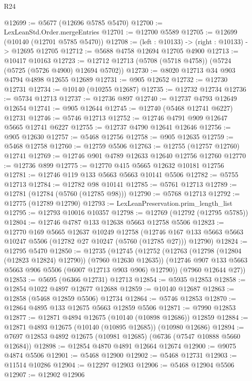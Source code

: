 \begin{lexlean}{R24}
\begin{coremodule}
@12699 := @5677 (@12696 @5785 @5470)
@12700 := LexLeanStd.Order.mergeEntries
@12701 := @12700 @5589
@12705 := @12699 (@10140 (@12701 @5785 @5470))
@12708 := (left : @10133) -> (right : @10133) -> @12695 @12705
@12712 := @5688 @4758 @12694 @12705 @4900
@12713 := @10417 @10163
@12723 := @12712 @12713 (@5708 (@5718 @4758)) (@5724 (@5725 (@5726 @4900) @12694 @5702))
@12730 := @8020 @12713 @34 @903 @4794 @4898 @12655 @12689
@12731 := @905 @12652
@12732 := @12730 @12731
@12734 := @10140 (@10255 @12687)
@12735 := @12732 @12734
@12736 := @5734 @12713
@12737 := @12736 @897
@12740 := @12737 @4793 @12649 @12654
@12741 := @905 @12644
@12745 := @12740 (@5468 @12741 @6227) @12731
@12746 := @5746 @12713
@12752 := @12746 @4791 @909 @12647 @5665 @12741 @6227
@12755 := @12737 @4790 @12641 @12646
@12756 := @905 @12630
@12757 := @5468 @12756
@12758 := @905 @12635
@12759 := @5468 @12758
@12760 := @12759 @5506
@12763 := @12755 (@12757 @12760) @12741
@12769 := @12746 @901 @4789 @12633 @12640 @12756 @12760
@12770 := @12736 @899
@12775 := @12770 @415 @5665 @12632 @10181 @12756
@12781 := @12746 @119 @133 @5663 @5663 @10141 @5506
@12782 := @5755 @12713
@12784 := @12782 @98 @10141
@12785 := @5761 @12713
@12789 := @12781 (@12784 (@5760 (@12785 @98)))
@12790 := @5768 @12713
@12792 := @12775 (@12789 @12790)
@12793 := LexLeanPreservation.prim_length_list
@12795 := @12793 @10016 @10357
@12798 := @12769 (@12792 (@12795 @5785))
@12804 := @12746 @4787 @133 @12638 @5663 @12758 @5506
@12823 := @12770
    @169
    @5665
    @12637
    @10249
    @12758
    (@12746 @167 @133 @5663 @5663 @10247 @5506 (@12782 @27 @10247 (@5760 (@12785 @27))) @12790)
@12824 := @12795 @5470
@12850 := @12735
    (@12745
      (@12752
        (@12763 (@12798 (@12804 (@12823 @12824) @12790)) (@7960 @12630 @12635))
        (@12746 @907 @133 @5663 @5663 @906 @5506 (@6007 @12713 @903 @906) @12790))
      (@7960 @12644 @27))
@12853 := @5695 (@6366 @12731) @12713
@12854 := @5935 @12853
@12858 := @12854 @1022 @4897 @12677 @12688
@12859 := @10140 @12687
@12863 := @12858 (@5468 @12859 @5506) @12734
@12864 := @5746 @12853
@12870 := @12864 @4895 @133 @12675 @5663 @12859 @5506
@12871 := @7990 @12853
@12877 := @12871 @4894 @12675 (@10140 (@10898 @12686)) @12859
@12884 := @12871 @4893 @12675 (@10140 (@10895 @12685)) (@10980 @12686)
@12894 := @7697 @12853 @4892 @12675 (@10981 @12685) (@6736 (@7547 @10888 @5660 @12684))
@12898 := @12854 @4870 @4891 @12664 @12674
@12900 := @9075 @4874 @5506
@12901 := @5468 @12900
@12902 := @5468 @12731
@12903 := @11514 @10286
@12904 := @12297 @12903
@12906 := @5468 @12904 @5506
@12907 := @12902 @12906

\end{coremodule}
\end{lexlean}
